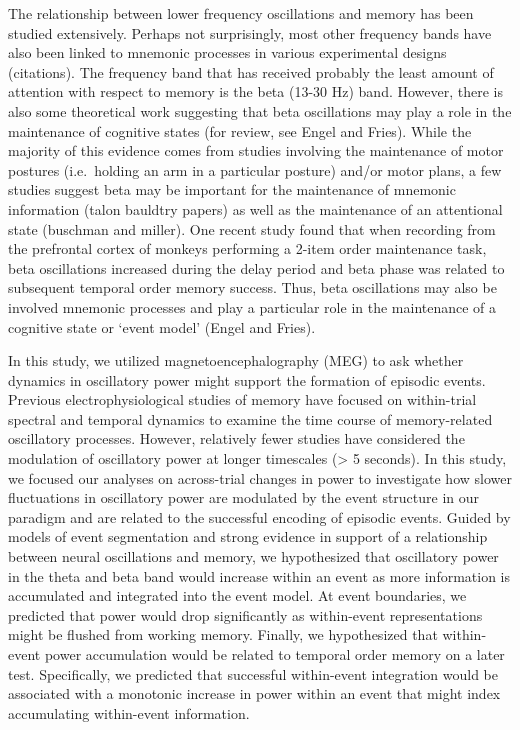 The relationship between lower frequency oscillations and memory has
been studied extensively. Perhaps not surprisingly, most other frequency
bands have also been linked to mnemonic processes in various
experimental designs (citations). The frequency band that has received
probably the least amount of attention with respect to memory is the
beta (13-30 Hz) band. However, there is also some theoretical work
suggesting that beta oscillations may play a role in the maintenance of
cognitive states (for review, see Engel and Fries). While the majority
of this evidence comes from studies involving the maintenance of motor
postures (i.e.~holding an arm in a particular posture) and/or motor
plans, a few studies suggest beta may be important for the maintenance
of mnemonic information (talon bauldtry papers) as well as the
maintenance of an attentional state (buschman and miller). One recent
study found that when recording from the prefrontal cortex of monkeys
performing a 2-item order maintenance task, beta oscillations increased
during the delay period and beta phase was related to subsequent
temporal order memory success. Thus, beta oscillations may also be
involved mnemonic processes and play a particular role in the
maintenance of a cognitive state or `event model' (Engel and Fries).

In this study, we utilized magnetoencephalography (MEG) to ask whether
dynamics in oscillatory power might support the formation of episodic
events. Previous electrophysiological studies of memory have focused on
within-trial spectral and temporal dynamics to examine the time course
of memory-related oscillatory processes. However, relatively fewer
studies have considered the modulation of oscillatory power at longer
timescales (\textgreater{} 5 seconds). In this study, we focused our
analyses on across-trial changes in power to investigate how slower
fluctuations in oscillatory power are modulated by the event structure
in our paradigm and are related to the successful encoding of episodic
events. Guided by models of event segmentation and strong evidence in
support of a relationship between neural oscillations and memory, we
hypothesized that oscillatory power in the theta and beta band would
increase within an event as more information is accumulated and
integrated into the event model. At event boundaries, we predicted that
power would drop significantly as within-event representations might be
flushed from working memory. Finally, we hypothesized that within-event
power accumulation would be related to temporal order memory on a later
test. Specifically, we predicted that successful within-event
integration would be associated with a monotonic increase in power
within an event that might index accumulating within-event information.

